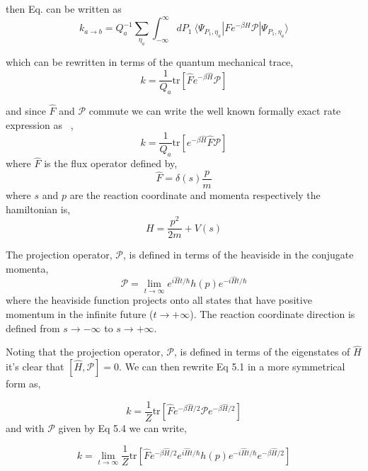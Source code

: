 \documentclass[phd,tocprelim]{cornell}
\begin{document}
then Eq. can be written as 
\begin{equation}
k_{a\to b} = Q_{a}^{-1}\sum_{\eta_a} \int_{-\infty}^{\infty} dP_1 \ \langle \Psi_{P_1, \eta_a}|F e^{-\beta H}\mathcal{P} | \Psi_{P_1, \eta_a} \rangle
\end{equation}

which can be rewritten in terms of the quantum mechanical trace, 
\begin{equation}
k = \frac{1}{Q_a}\textrm{tr}[ \hat{F}e^{-\beta \hat{H}} \mathcal{P}]
\end{equation}


and since  $\hat{F}$ and  $\mathcal{P}$ commute we can write the well known formally exact rate expression as ~\cite{MILLER1974,TROMP1983}, 
\begin{equation}
k = \frac{1}{Q_a}\textrm{tr}[e^{-\beta \hat{H}} \hat{F} \mathcal{P}]
\end{equation}
 where  $\hat{F}$ is the flux operator defined by,
 \begin{equation}
 \hat{F}=\delta (s)\frac{p}{m}
 \end{equation}
  where $s$ and $p$ are the reaction coordinate and momenta respectively
 the hamiltonian is, 
 \begin{equation}
 H= \frac{p^2}{2m} + V(s)
 \end{equation}

The projection operator,  $\mathcal{P}$, is defined in terms of the heaviside in the conjugate momenta,
\begin{equation}
\mathcal{P}=\lim_{t \to \infty} e^{i \hat{H} t/\hbar}h(p)e^{-i \hat{H} t/\hbar}
\end{equation}
where the heaviside function projects onto all states that have positive momentum in the infinite future ($t\to +\infty$). The reaction coordinate direction is defined from  $s\to -\infty$ to  $s\to +\infty$. 

Noting that the projection operator, $\mathcal{P}$, is defined in terms of the eigenstates of $\hat{H}$ it's clear that $[\hat{H}, \mathcal{P}]=0$. We can then rewrite Eq 5.1 in a more symmetrical form as, 

\begin{equation}
k = \frac{1}{Z}\textrm{tr}[\hat{F}e^{-\beta \hat{H}/2}  \mathcal{P} e^{-\beta \hat{H}/2} ]
\end{equation}
 and with $\mathcal{P}$ given by Eq 5.4 we can write,
 
 \begin{equation}
k = \lim_{t \to \infty}\frac{1}{Z}\textrm{tr}[\hat{F}e^{-\beta \hat{H}/2} e^{i \hat{H} t/\hbar}h(p)e^{-i \hat{H} t/\hbar} e^{-\beta \hat{H}/2} ]
\end{equation}
\end{document}
